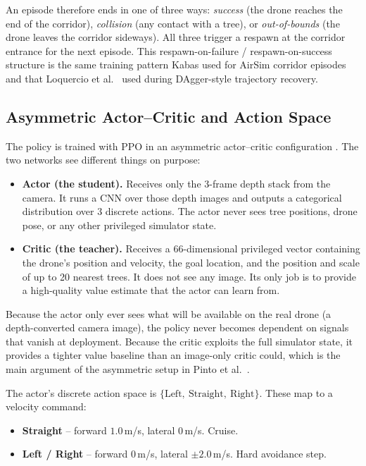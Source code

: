 \documentclass[../main.tex]{subfiles}
\begin{document}
An episode therefore ends in one of three ways: \textit{success} (the drone reaches the end of the corridor), \textit{collision} (any contact with a tree), or \textit{out-of-bounds} (the drone leaves the corridor sideways). All three trigger a respawn at the corridor entrance for the next episode. This respawn-on-failure / respawn-on-success structure is the same training pattern Kabas \cite{Kabas2022} used for AirSim corridor episodes and that Loquercio et al.\ \cite{Loquercio2019} used during DAgger-style trajectory recovery.

\subsection{Asymmetric Actor--Critic and Action Space}

The policy is trained with PPO \cite{Schulman2017} in an asymmetric actor--critic configuration \cite{Pinto2017}. The two networks see different things on purpose:

\begin{itemize}
  \item \textbf{Actor (the student).} Receives only the 3-frame depth stack from the camera. It runs a CNN over those depth images and outputs a categorical distribution over 3 discrete actions. The actor never sees tree positions, drone pose, or any other privileged simulator state.
  \item \textbf{Critic (the teacher).} Receives a 66-dimensional privileged vector containing the drone's position and velocity, the goal location, and the position and scale of up to 20 nearest trees. It does not see any image. Its only job is to provide a high-quality value estimate that the actor can learn from.
\end{itemize}

Because the actor only ever sees what will be available on the real drone (a depth-converted camera image), the policy never becomes dependent on signals that vanish at deployment. Because the critic exploits the full simulator state, it provides a tighter value baseline than an image-only critic could, which is the main argument of the asymmetric setup in Pinto et al.\ \cite{Pinto2017}.

The actor's discrete action space is $\{\text{Left},\ \text{Straight},\ \text{Right}\}$. These map to a velocity command:

\begin{itemize}
  \item \textbf{Straight} -- forward $1.0$\,m/s, lateral $0$\,m/s. Cruise.
  \item \textbf{Left / Right} -- forward $0$\,m/s, lateral $\pm 2.0$\,m/s. Hard avoidance step.
\end{itemize}
\end{document}

